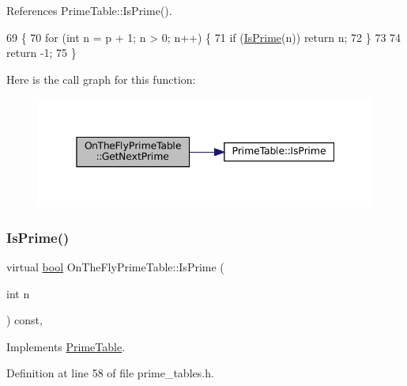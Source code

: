 References Prime\+Table\+::\+Is\+Prime().


\begin{DoxyCode}
69                                         \{
70     \textcolor{keywordflow}{for} (\textcolor{keywordtype}{int} n = p + 1; n > 0; n++) \{
71       \textcolor{keywordflow}{if} (\hyperlink{classOnTheFlyPrimeTable_a1d49b78f79e018441289e79d75680067}{IsPrime}(n)) \textcolor{keywordflow}{return} n;
72     \}
73 
74     \textcolor{keywordflow}{return} -1;
75   \}
\end{DoxyCode}
Here is the call graph for this function\+:
\nopagebreak
\begin{figure}[H]
\begin{center}
\leavevmode
\includegraphics[width=345pt]{classOnTheFlyPrimeTable_a5a4644fedd95d33136723f33b9302bfc_cgraph}
\end{center}
\end{figure}
\mbox{\label{classOnTheFlyPrimeTable_a1d49b78f79e018441289e79d75680067}} 
\subsubsection{\texorpdfstring{Is\+Prime()}{IsPrime()}}
{\footnotesize\ttfamily virtual \hyperlink{classbool}{bool} On\+The\+Fly\+Prime\+Table\+::\+Is\+Prime (\begin{DoxyParamCaption}\item[{int}]{n }\end{DoxyParamCaption}) const\hspace{0.3cm}{\ttfamily [inline]}, {\ttfamily [virtual]}}



Implements \hyperlink{classPrimeTable_a2ab9243364ded0c51541f641b2df362a}{Prime\+Table}.



Definition at line 58 of file prime\+\_\+tables.\+h.


